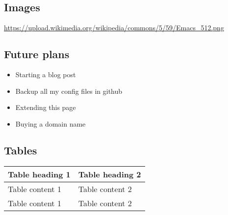 \documentclass[11pt]{article}
\begin{document}
\subsection{Images}
\label{sec:org032bf20}
\url{https://upload.wikimedia.org/wikipedia/commons/5/59/Emacs\_512.png}

\subsection{Future plans}
\label{sec:org8687ee4}
\begin{itemize}
\item Starting a blog post
\item Backup all my config files in github
\item Extending this page
\item Buying a domain name
\end{itemize}

\subsection{Tables}
\label{sec:org2a165f9}

\begin{center}
\begin{tabular}{ll}
Table heading 1 & Table heading 2\\
\hline
Table content 1 & Table content 2\\
Table content 1 & Table content 2\\
\end{tabular}
\end{center}
\end{document}
